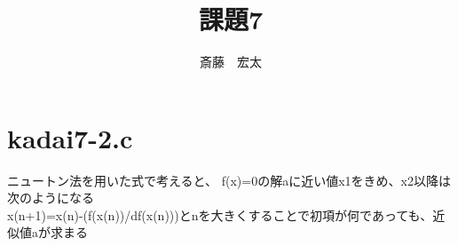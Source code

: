 \documentclass[dvipdfmx,autodetect-engine]{jsarticle}
\title{課題7}
\author{斎藤　宏太}
\begin{document}
\maketitle
\section{kadai7-2.c}
ニュートン法を用いた式で考えると、
f(x)=0の解aに近い値x1をきめ、x2以降は次のようになる\\
x(n+1)=x(n)-(f(x(n))/df(x(n)))とnを大きくすることで初項が何であっても、近似値aが求まる\\
\end{document}
